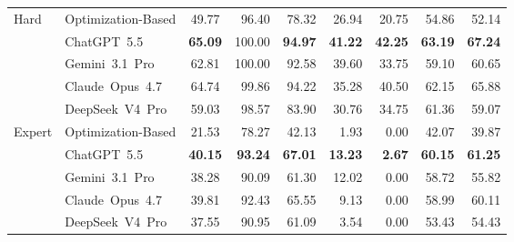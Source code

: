 \begin{table}[!t]
\begin{tabular*}{\textwidth}{@{\extracolsep{\fill}}llcrrrrrr@{}}
        Hard & Optimization-Based
        & 49.77 & 96.40 & 78.32 & 26.94
        & 20.75 & 54.86 & 52.14 \\
        & ChatGPT~5.5
        & \textbf{65.09} & 100.00 & \textbf{94.97} & \textbf{41.22}
        & \textbf{42.25} & \textbf{63.19} & \textbf{67.24} \\
        & Gemini~3.1~Pro
        & 62.81 & 100.00 & 92.58 & 39.60 & 33.75 & 59.10 & 60.65 \\
        & Claude~Opus~4.7
        & 64.74 & 99.86 & 94.22 & 35.28 & 40.50 & 62.15 & 65.88 \\
        & DeepSeek~V4~Pro
        & 59.03 & 98.57 & 83.90 & 30.76 & 34.75 & 61.36 & 59.07 \\
        \addlinespace

        Expert & Optimization-Based
        & 21.53 & 78.27 & 42.13 & 1.93
        & 0.00 & 42.07 & 39.87 \\
        & ChatGPT~5.5
        & \textbf{40.15} & \textbf{93.24} & \textbf{67.01} & \textbf{13.23}
        & \textbf{2.67} & \textbf{60.15} & \textbf{61.25} \\
        & Gemini~3.1~Pro
        & 38.28 & 90.09 & 61.30 & 12.02 & 0.00 & 58.72 & 55.82 \\
        & Claude~Opus~4.7
        & 39.81 & 92.43 & 65.55 & 9.13 & 0.00 & 58.99 & 60.11 \\
        & DeepSeek~V4~Pro
        & 37.55 & 90.95 & 61.09 & 3.54 & 0.00 & 53.43 & 54.43 \\
        \bottomrule
    \end{tabular*}
\end{table}
